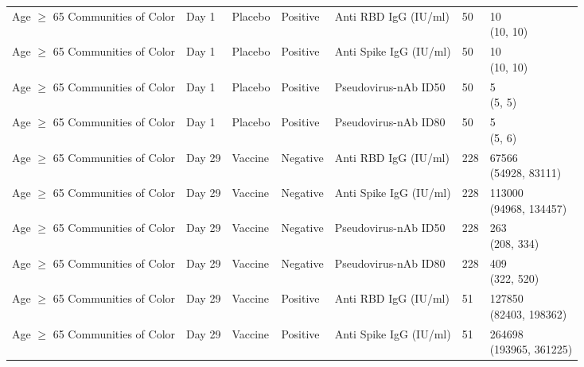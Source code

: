\documentclass[]{book}
\theoremstyle{definition}
\theoremstyle{definition}
\theoremstyle{definition}
\newcommand{\1}{\mathbbm{1}}
\begin{document}
\begin{landscape}
\begin{ThreePartTable}
\begin{longtable}[t]{>{\raggedright\arraybackslash}p{7cm}llllll}
\hspace{1em}Age $\geq$ 65 Communities of Color & Day 1 & Placebo & Positive & Anti RBD IgG (IU/ml) & 50 & \makecell[l]{10\\(10, 10)}\\
\hspace{1em}Age $\geq$ 65 Communities of Color & Day 1 & Placebo & Positive & Anti Spike IgG (IU/ml) & 50 & \makecell[l]{10\\(10, 10)}\\
\hspace{1em}Age $\geq$ 65 Communities of Color & Day 1 & Placebo & Positive & Pseudovirus-nAb ID50 & 50 & \makecell[l]{5\\(5, 5)}\\
\hspace{1em}Age $\geq$ 65 Communities of Color & Day 1 & Placebo & Positive & Pseudovirus-nAb ID80 & 50 & \makecell[l]{5\\(5, 6)}\\
\hspace{1em}Age $\geq$ 65 Communities of Color & Day 29 & Vaccine & Negative & Anti RBD IgG (IU/ml) & 228 & \makecell[l]{67566\\(54928, 83111)}\\
\hspace{1em}Age $\geq$ 65 Communities of Color & Day 29 & Vaccine & Negative & Anti Spike IgG (IU/ml) & 228 & \makecell[l]{113000\\(94968, 134457)}\\
\hspace{1em}Age $\geq$ 65 Communities of Color & Day 29 & Vaccine & Negative & Pseudovirus-nAb ID50 & 228 & \makecell[l]{263\\(208, 334)}\\
\hspace{1em}Age $\geq$ 65 Communities of Color & Day 29 & Vaccine & Negative & Pseudovirus-nAb ID80 & 228 & \makecell[l]{409\\(322, 520)}\\
\hspace{1em}Age $\geq$ 65 Communities of Color & Day 29 & Vaccine & Positive & Anti RBD IgG (IU/ml) & 51 & \makecell[l]{127850\\(82403, 198362)}\\
\hspace{1em}Age $\geq$ 65 Communities of Color & Day 29 & Vaccine & Positive & Anti Spike IgG (IU/ml) & 51 & \makecell[l]{264698\\(193965, 361225)}\\

\end{longtable}
\end{ThreePartTable}
\end{landscape}
\end{document}
